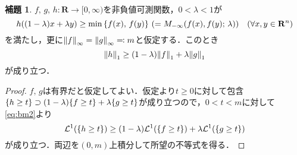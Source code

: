 \documentclass[a4j]{ltjsarticle}
\newcommand{\Rset}{\mathbf{R}}
\newcommand{\Lm}{\mathcal{L}}
\newcommand{\1}{\bm{1}}
\newcommand{\M}[4]{M_{#1}\qty(#2,#3;\,#4)}
\numberwithin{equation}{section}
\theoremstyle{definition}
\newtheorem{lem}[thm]{補題}
\begin{document}
\begin{lem}\label{lem:bbl_1}
    $f,\,g,\,h\colon \Rset\to [0,\infty)$を非負値可測関数，$0<\lambda<1$が
    \begin{equation}
        h((1-\lambda)x+\lambda y)\geq \min\qty{f(x),\,f(y)}\ (=\M{-\infty}{f(x)}{f(y)}{\lambda})\quad (\forall x,y\in\Rset^n)\label{eq:bbl_assump}
    \end{equation}
    を満たし，更に$\norm{f}_{\infty}=\norm{g}_{\infty}\eqqcolon m$と仮定する．このとき
    \begin{equation}
        \norm{h}_1\geq (1-\lambda)\norm{f}_1+\lambda\norm{g}_1
    \end{equation}
    が成り立つ．
\end{lem}
\begin{proof}
    $f,\,g$は有界だと仮定してよい．仮定より$t\geq0$に対して包含$\qty{h\geq t}\supset (1-\lambda)\qty{f\geq t}+\lambda\qty{g\geq t}$が成り立つので，$0<t<m$に対して\eqref{eq:bm2}より
    \begin{equation}
        \Lm^1(\qty{h\geq t})\geq (1-\lambda)\Lm^1(\qty{f\geq t})+\lambda \Lm^1(\qty{g\geq t})
    \end{equation}
    が成り立つ．両辺を$(0,m)$上積分して所望の不等式を得る．
\end{proof}
\end{document}
